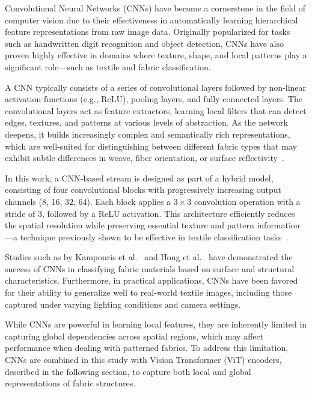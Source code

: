 Convolutional Neural Networks (CNNs) have become a cornerstone in the field of computer vision due to their effectiveness in automatically learning hierarchical feature representations from raw image data. Originally popularized for tasks such as handwritten digit recognition and object detection, CNNs have also proven highly effective in domains where texture, shape, and local patterns play a significant role—such as textile and fabric classification.

A CNN typically consists of a series of convolutional layers followed by non-linear activation functions (e.g., ReLU), pooling layers, and fully connected layers. The convolutional layers act as feature extractors, learning local filters that can detect edges, textures, and patterns at various levels of abstraction. As the network deepens, it builds increasingly complex and semantically rich representations, which are well-suited for distinguishing between different fabric types that may exhibit subtle differences in weave, fiber orientation, or surface reflectivity~\cite{simonyan2015vgg, lecun1998gradient}.

In this work, a CNN-based stream is designed as part of a hybrid model, consisting of four convolutional blocks with progressively increasing output channels (8, 16, 32, 64). Each block applies a $3\times3$ convolution operation with a stride of 3, followed by a ReLU activation. This architecture efficiently reduces the spatial resolution while preserving essential texture and pattern information—a technique previously shown to be effective in textile classification tasks~\cite{hong2024research}.

Studies such as by Kampouris et al.~\cite{kampouris2016fine} and Hong et al.~\cite{hong2024research} have demonstrated the success of CNNs in classifying fabric materials based on surface and structural characteristics. Furthermore, in practical applications, CNNs have been favored for their ability to generalize well to real-world textile images, including those captured under varying lighting conditions and camera settings.

While CNNs are powerful in learning local features, they are inherently limited in capturing global dependencies across spatial regions, which may affect performance when dealing with patterned fabrics. To address this limitation, CNNs are combined in this study with Vision Transformer (ViT) encoders, described in the following section, to capture both local and global representations of fabric structures.

